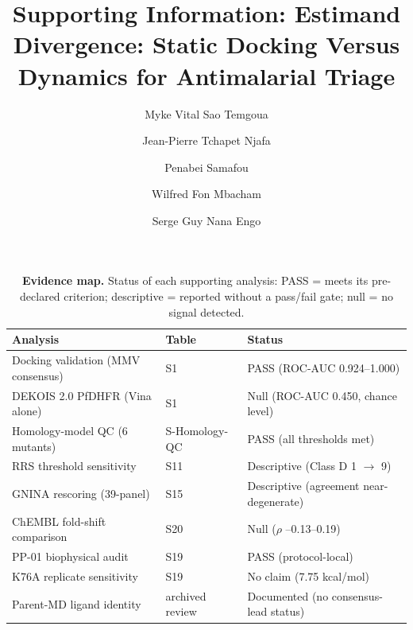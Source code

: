 \documentclass[11pt,a4paper]{article}
\title{Supporting Information: Estimand Divergence: Static Docking Versus Dynamics for Antimalarial Triage}
\author{Myke Vital Sao Temgoua \and Jean-Pierre Tchapet Njafa \and Penabei Samafou \and Wilfred Fon Mbacham \and Serge Guy Nana Engo}
\date{}
\begin{document}
\maketitle


\begin{table}[htbp]
\centering
\caption{\textbf{Evidence map.} Status of each supporting analysis: PASS = meets its pre-declared criterion; descriptive = reported without a pass/fail gate; null = no signal detected.}
\label{tab:s0_evidence_map}
\small
\begin{tabular}{@{}l l l@{}}
\toprule
Analysis & Table & Status \\
\midrule
Docking validation (MMV consensus) & S1 & PASS (ROC-AUC 0.924--1.000) \\
DEKOIS 2.0 PfDHFR (Vina alone) & S1 & Null (ROC-AUC 0.450, chance level) \\
Homology-model QC (6 mutants) & S-Homology-QC & PASS (all thresholds met) \\
RRS threshold sensitivity & S11 & Descriptive (Class D 1 $\to$ 9) \\
GNINA rescoring (39-panel) & S15 & Descriptive (agreement near-degenerate) \\
ChEMBL fold-shift comparison & S20 & Null ($\rho$ --0.13--0.19) \\
PP-01 biophysical audit & S19 & PASS (protocol-local) \\
K76A replicate sensitivity & S19 & No claim (7.75 kcal/mol) \\
Parent-MD ligand identity & archived review & Documented (no consensus-lead status) \\
\bottomrule
\end{tabular}
\end{table}





\end{document}

